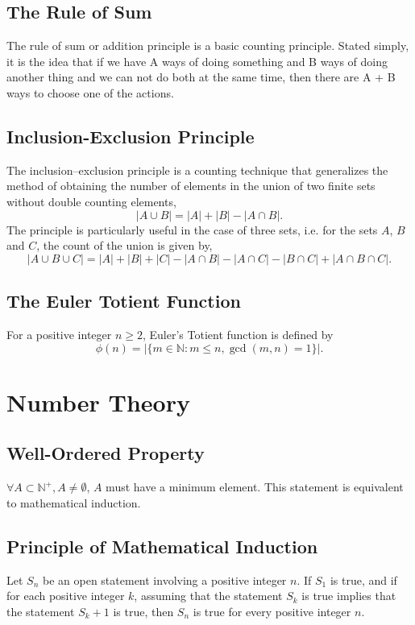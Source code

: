 \documentclass{article}
\begin{document}
\subsection{The Rule of Sum}
The rule of sum or addition principle is a basic counting principle. Stated simply, it is the idea that if we have A ways of doing something and B ways of doing another thing and we can not do both at the same time, then there are A + B ways to choose one of the actions.

\subsection{Inclusion-Exclusion Principle}
The inclusion–exclusion principle is a counting technique that generalizes the method of obtaining the number of elements in the union of two finite sets without double counting elements,
\[
    |A\cup B|=|A|+|B|-|A\cap B|.
\]
The principle is particularly useful in the case of three sets, i.e. for the sets $A$, $B$ and $C$, the count of the union is given by,
\[
|A\cup B\cup C|=|A|+|B|+|C|-|A\cap B|-|A\cap C|-|B\cap C|+|A\cap B\cap C|.
\]

\subsection{The Euler Totient Function}
For a positive integer $n\geq2$, Euler's Totient function is defined by 
\[
\phi(n)=|\{m\in \mathbb N: m\le n,  \gcd(m,n)=1\}|.
\]

\section{Number Theory}

\subsection{Well-Ordered Property}
$\forall A \subset \mathbb N^+, A \neq \emptyset$, $A$ must have a minimum element. This statement is equivalent to mathematical induction.

\subsection{Principle of Mathematical Induction}
Let $S_n$ be an open statement involving a positive integer $n$. If $S_1$ is true, and if for each positive integer $k$, assuming that the statement $S_k$ is true implies that the statement $S_k + 1$ is true, then $S_n$ is true for every positive integer $n$.
\end{document}
